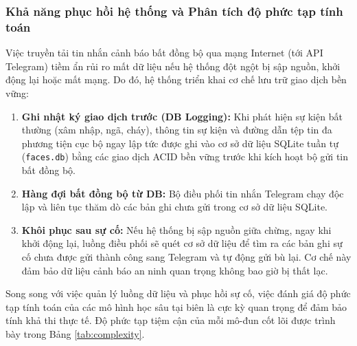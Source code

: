 \documentclass[12pt,a4paper]{article}
\begin{document}
\subsubsection*{Khả năng phục hồi hệ thống và Phân tích độ phức tạp tính toán}
Việc truyền tải tin nhắn cảnh báo bất đồng bộ qua mạng Internet (tới API Telegram) tiềm ẩn rủi ro mất dữ liệu nếu hệ thống đột ngột bị sập nguồn, khởi động lại hoặc mất mạng. Do đó, hệ thống triển khai cơ chế lưu trữ giao dịch bền vững:
\begin{enumerate}
    \item \textbf{Ghi nhật ký giao dịch trước (DB Logging):} Khi phát hiện sự kiện bất thường (xâm nhập, ngã, cháy), thông tin sự kiện và đường dẫn tệp tin đa phương tiện cục bộ ngay lập tức được ghi vào cơ sở dữ liệu SQLite tuần tự (\texttt{faces.db}) bằng các giao dịch ACID bền vững trước khi kích hoạt bộ gửi tin bất đồng bộ.
    \item \textbf{Hàng đợi bất đồng bộ từ DB:} Bộ điều phối tin nhắn Telegram chạy độc lập và liên tục thăm dò các bản ghi chưa gửi trong cơ sở dữ liệu SQLite.
    \item \textbf{Khôi phục sau sự cố:} Nếu hệ thống bị sập nguồn giữa chừng, ngay khi khởi động lại, luồng điều phối sẽ quét cơ sở dữ liệu để tìm ra các bản ghi sự cố chưa được gửi thành công sang Telegram và tự động gửi bù lại. Cơ chế này đảm bảo dữ liệu cảnh báo an ninh quan trọng không bao giờ bị thất lạc.
\end{enumerate}

Song song với việc quản lý luồng dữ liệu và phục hồi sự cố, việc đánh giá độ phức tạp tính toán của các mô hình học sâu tại biên là cực kỳ quan trọng để đảm bảo tính khả thi thực tế. Độ phức tạp tiệm cận của mỗi mô-đun cốt lõi được trình bày trong Bảng \ref{tab:complexity}.

\begin{table}[h]
    \centering
    \caption{Độ phức tạp tính toán của các mô-đun hệ thống đề xuất}
    \label{tab:complexity}
\end{table}
\end{document}
